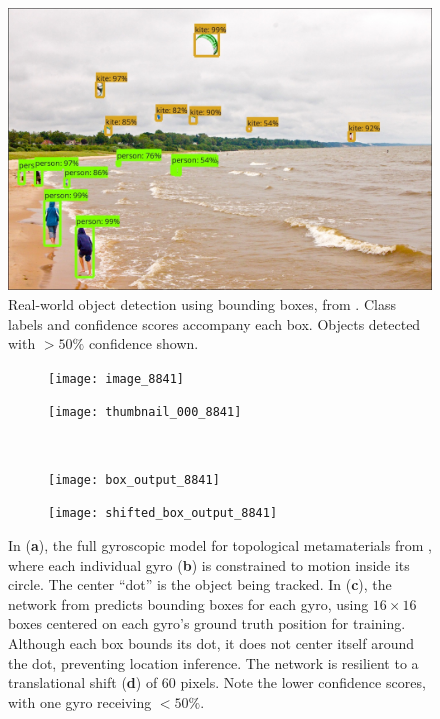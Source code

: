 \documentclass[twocolumn, 10pt]{asme2ej}
\begin{document}
\begin{figure}
  \centering
  \includegraphics[width=0.8\columnwidth]{kites_detections_output}
  \caption{Real-world object detection using bounding boxes, from
    \cite{huang_speed/accuracy_2016}. Class labels and confidence scores
    accompany each box. Objects detected with $> 50\%$ confidence shown.}
  \label{fig:real-world}
\end{figure}

\begin{figure}
  \centering
  \begin{subfigure}[b]{0.45\columnwidth}
    \texttt{[image: image\_8841]}
    \caption{}
    \label{fig:bare-gyros}
  \end{subfigure}
  \hfill
  \begin{subfigure}[b]{0.45\columnwidth}
    \centering
    \texttt{[image: thumbnail\_000\_8841]}
    \caption{}
    \label{fig:single-bare-gyro}
  \end{subfigure} \\
  \begin{subfigure}[b]{0.45\columnwidth}
    \texttt{[image: box\_output\_8841]}
    \caption{}
    \label{fig:bounding-boxes}
  \end{subfigure}
  \hfill
  \begin{subfigure}[b]{0.45\columnwidth}
    \texttt{[image: shifted\_box\_output\_8841]}
    \caption{}
    \label{fig:bounding-boxes-shifted}
  \end{subfigure}
  \caption{In (\textbf{a}), the full gyroscopic model for topological
    metamaterials from \cite{nash_topological_2015}, where each individual gyro
    (\textbf{b}) is constrained to motion inside its circle. The center ``dot''
    is the object being tracked. In (\textbf{c}), the network from
    \cite{huang_speed/accuracy_2016} predicts bounding boxes for each gyro,
    using $16\times 16$ boxes centered on each gyro's ground truth position for
    training. Although each box bounds its dot, it does not center itself around
    the dot, preventing location inference. The network is resilient to a
    translational shift (\textbf{d}) of $60$ pixels. Note the lower confidence
    scores, with one gyro receiving $< 50\%$.}
  \label{fig:gyro-image}
\end{figure}
\end{document}
